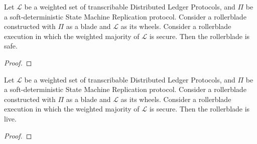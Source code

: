\begin{corollary}[Safety]
      Let $\mathcal{L}$ be a weighted set of transcribable Distributed Ledger Protocols,
      and $\Pi$ be a soft-deterministic State Machine Replication protocol.
      Consider a rollerblade constructed with $\Pi$ as a blade and
      $\mathcal{L}$ as its wheels.
      Consider a rollerblade execution in which the weighted majority of $\mathcal{L}$
      is secure.
      Then the rollerblade is safe.
\end{corollary}
\begin{proof}
\end{proof}

\begin{corollary}[Liveness]
      Let $\mathcal{L}$ be a weighted set of transcribable Distributed Ledger Protocols,
      and $\Pi$ be a soft-deterministic State Machine Replication protocol.
      Consider a rollerblade constructed with $\Pi$ as a blade and
      $\mathcal{L}$ as its wheels.
      Consider a rollerblade execution in which the weighted majority of $\mathcal{L}$
      is secure.
      Then the rollerblade is live.
\end{corollary}
\begin{proof}
\end{proof}
